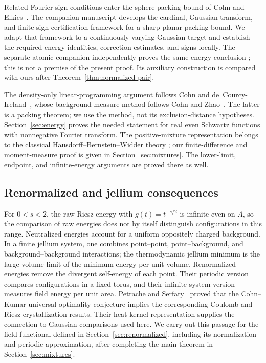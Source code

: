 Related Fourier sign conditions enter the sphere-packing bound of
Cohn and Elkies~\citep{CohnElkies2003}.  The companion manuscript
\citep[Sections~2--4]{SharpPlanar2026} develops the cardinal,
Gaussian-transform, and finite sign-certification framework for a sharp planar
packing bound.  We adapt that framework to a continuously varying Gaussian
target and establish the required energy identities, correction estimates,
and signs locally.  The separate atomic companion independently proves the same
energy conclusion \mbox{\citep[Theorem~1.1]{AtomicTriangular2026}}; this is not a
premise of the present proof.  Its auxiliary construction is compared with
ours after Theorem~\ref{thm:normalized-pair}.

The density-only linear-programming argument follows
Cohn and de~Courcy-Ireland~\citep[\mbox{Proposition~2.2}]{CohnDeCourcyIreland2018}, whose background-measure
method follows Cohn and Zhao~\citep[Theorem~3.3]{CohnZhao2014}.  The latter is a packing
theorem; we use the method, not its exclusion-distance hypotheses.
Section~\ref{sec:energy} proves the needed statement for real even Schwartz
functions with nonnegative Fourier transform.  The positive-mixture
representation belongs to the classical Hausdorff--Bernstein--Widder theory
\citep{Hausdorff1921,Bernstein1929,Widder1931}; our finite-difference and
moment-measure proof is given in Section~\ref{sec:mixtures}.  The lower-limit,
endpoint, and infinite-energy arguments are proved there as well.

\subsection{Renormalized and jellium consequences}

For $0<s<2$, the raw Riesz energy with $g(t)=t^{-s/2}$ is infinite even
on $A$, so the comparison of raw energies does not by itself distinguish
configurations in this range.  Neutralized energies account for a uniform
oppositely charged background.  In a finite jellium system, one combines
point--point, point--background, and background--background interactions;
the thermodynamic jellium minimum is the large-volume limit of the minimum
energy per unit volume.  Renormalized energies remove the divergent
self-energy of each point.  Their periodic version compares configurations
in a fixed torus, and their infinite-system version measures field energy
per unit area.  Petrache and Serfaty~\citep[Theorem~2]{PetracheSerfaty2020} proved that the
Cohn--Kumar universal-optimality conjecture implies the corresponding
Coulomb and Riesz crystallization results.  Their heat-kernel representation
\citep[Lemma~1]{PetracheSerfaty2020} supplies the connection to Gaussian
comparisons used here.  We carry out this passage for the field functional
defined in Section~\ref{sec:renormalized}, including its normalization and
periodic approximation, after completing the main theorem in
Section~\ref{sec:mixtures}.

